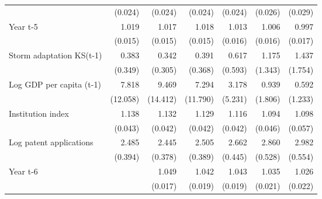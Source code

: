 \begin{table}[htbp]
\begin{tabular}{l*{6}{D{.}{.}{-1}}}
                    &     (0.024)         &     (0.024)         &     (0.024)         &     (0.024)         &     (0.026)         &     (0.029)         \\
\addlinespace
Year t-5            &       1.019         &       1.017         &       1.018         &       1.013         &       1.006         &       0.997         \\
                    &     (0.015)         &     (0.015)         &     (0.015)         &     (0.016)         &     (0.016)         &     (0.017)         \\
\addlinespace
Storm adaptation KS(t-1)&       0.383         &       0.342         &       0.391         &       0.617         &       1.175         &       1.437         \\
                    &     (0.349)         &     (0.305)         &     (0.368)         &     (0.593)         &     (1.343)         &     (1.754)         \\
\addlinespace
Log GDP per capita (t-1)&       7.818         &       9.469\sym{\%}  &       7.294         &       3.178         &       0.939         &       0.592         \\
                    &    (12.058)         &    (14.412)         &    (11.790)         &     (5.231)         &     (1.806)         &     (1.233)         \\
\addlinespace
Institution index   &       1.138\sym{***}&       1.132\sym{***}&       1.129\sym{***}&       1.116\sym{***}&       1.094\sym{**} &       1.098\sym{*}  \\
                    &     (0.043)         &     (0.042)         &     (0.042)         &     (0.042)         &     (0.046)         &     (0.057)         \\
\addlinespace
Log patent applications&       2.485\sym{***}&       2.445\sym{***}&       2.505\sym{***}&       2.662\sym{***}&       2.860\sym{***}&       2.982\sym{***}\\
                    &     (0.394)         &     (0.378)         &     (0.389)         &     (0.445)         &     (0.528)         &     (0.554)         \\
\addlinespace
Year t-6            &                     &       1.049\sym{***}&       1.042\sym{**} &       1.043\sym{**} &       1.035\sym{*}  &       1.026         \\
                    &                     &     (0.017)         &     (0.019)         &     (0.019)         &     (0.021)         &     (0.022)         \\

\end{tabular}
\end{table}
